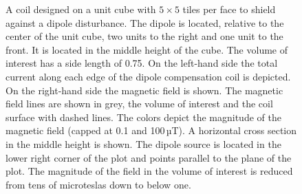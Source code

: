 \begin{figure}
  \centering
  \quad
  \caption{A coil designed on a unit cube with $5 \times 5$ tiles per face to shield against a dipole disturbance. The dipole is located, relative to the center of the unit cube, two units to the right and one unit to the front. It is located in the middle height of the cube. The volume of interest has a side length of 0.75. On the left-hand side the total current along each edge of the dipole compensation coil is depicted. On the right-hand side the magnetic field is shown. The magnetic field lines are shown in grey, the volume of interest and the coil surface with dashed lines. The colors depict the magnitude of the magnetic field (capped at 0.1 and 100\,µT). A horizontal cross section in the middle height is shown. The dipole source is located in the lower right corner of the plot and points parallel to the plane of the plot. The magnitude of the field in the volume of interest is reduced from tens of microteslas down to below one.}
  \label{fig:showcase}
\end{figure}
  











